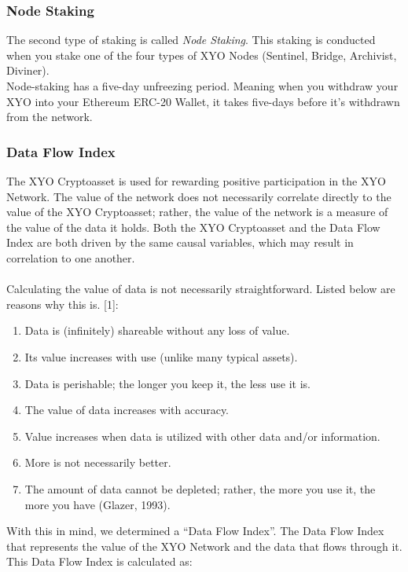 \documentclass{article}
\begin{document}
\subsubsection{Node Staking}

The second type of staking is called \textit{Node Staking}. This staking is conducted when you stake one of the four types of XYO Nodes (Sentinel, Bridge, Archivist, Diviner).\\ 

Node-staking has a five-day unfreezing period. Meaning when you withdraw your XYO into your Ethereum ERC-20 Wallet, it takes five-days before it’s withdrawn from the network.

\subsubsection{Data Flow Index}

The XYO Cryptoasset is used for rewarding positive participation in the XYO Network. The value of the network does not necessarily correlate directly to the value of the XYO Cryptoasset; rather, the value of the network is a measure of the value of the data it holds. Both the XYO Cryptoasset and the Data Flow Index are both driven by the same causal variables, which may result in correlation to one another. \\\\

Calculating the value of data is not necessarily straightforward. Listed below are reasons why this is. [1]:

\begin{enumerate}
  \item Data is (infinitely) shareable without any loss of value.
  \item Its value increases with use (unlike many typical assets).
  \item Data is perishable; the longer you keep it, the less use it is.
  \item The value of data increases with accuracy.
  \item Value increases when data is utilized with other data and/or information.
  \item More is not necessarily better.
  \item The amount of data cannot be depleted; rather, the more you use it, the more you have (Glazer, 1993).
\end{enumerate}
With this in mind, we determined a ``Data Flow Index''. The Data Flow Index that represents the value of the XYO Network and the data that flows through it. This Data Flow Index is calculated as:
\end{document}
